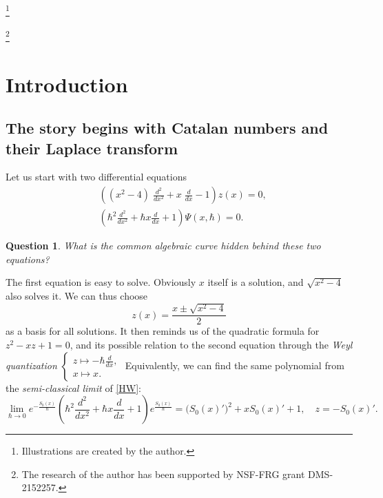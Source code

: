 \documentclass{amsart}
\newtheorem{quest}[thm]{Question}
\theoremstyle{definition}
\numberwithin{equation}{section}
\numberwithin{figure}{section}
\newcommand{\rar}{\rightarrow}
\begin{document}


\thanks{Illustrations are created by
the author.}

\thanks{The research 
of the author has been supported by NSF-FRG grant DMS-2152257.}

\maketitle




\tableofcontents


\allowdisplaybreaks

\section{Introduction}

\subsection{The story begins with Catalan numbers and their Laplace transform}

Let us start with two differential equations
\begin{align}
\label{PF}
&\left((x^2-4)\;\frac{d^2}{dx^2} + x\; \frac{d}{dx} -1
\right) z(x) = 0,
\\
\label{HW}
&\left(\hbar^2 \frac{d^2}{dx^2} + \hbar x\frac{d}{dx}+  1\right)
\Psi(x,\hbar)
=0.
\end{align}

\begin{quest}
What is the common algebraic curve hidden behind these two 
equations?
\end{quest}



The first equation is easy to solve. Obviously $x$ itself is a solution,
and $\sqrt{x^2-4}$ also solves it. We can thus choose
$$
z(x) = \frac{x\pm \sqrt{x^2-4}}{2}
$$
as a basis for all solutions. It then reminds us of the quadratic formula for
$z^2-xz+1=0$,
and its possible relation to the second equation through the \emph{Weyl
quantization}
$
\begin{cases}
z\longmapsto -\hbar\frac{d}{dx},\\
x\longmapsto x.
\end{cases}
$
Equivalently, we can find the same  polynomial from 
the \emph{semi-classical limit} of \eqref{HW}:
$$
\lim_{\hbar\rar 0}e^{-\frac{S_0(x)}{\hbar}}
\left(\hbar^2 \frac{d^2}{dx^2} + \hbar x\frac{d}{dx}+  1\right)
e^{\frac{S_0(x)}{\hbar}} = \big(S_0(x)'\big)^2 + x S_0(x)' + 1, \quad 
z=-S_0(x)'.
$$
\end{document}
